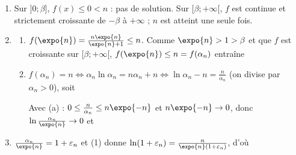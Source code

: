 \begin{description}
\begin{description}
\begin{enumerate}
\begin{enumerate}
\begin{center}
					\end{center}
			\end{enumerate}
		\end{enumerate}
		\item[II-]
		\begin{enumerate}
			\item {}
				Sur $]0;\beta]$, $f(x) \leq 0 < n$ : pas de solution. Sur $[\beta;+\infty[$, $f$ est continue et strictement croissante de $-\beta$ à $+\infty$ ; $n$ est atteint une seule fois.
				\par\noindent{}
			\item
			\begin{enumerate}
				\item {}
					$f(\expo{n}) = \frac{n\expo{n}}{\expo{n} + 1} \leq n$. Comme $\expo{n} > 1 > \beta$ et que $f$ est croissante sur $[\beta;+\infty[$,
					$f(\expo{n}) \leq n = f(\alpha_n)$ entraîne \par\noindent{}
				\item {}
					$f(\alpha_n) = n \iff \alpha_n\ln\alpha_n = n\alpha_n + n \iff \ln\alpha_n - n = \frac{n}{\alpha_n}$ (on divise par $\alpha_n > 0$), soit
					\par\noindent{}
					Avec (a) : $0 \leq \frac{n}{\alpha_n} \leq n\expo{-n}$ et $n\expo{-n} \to 0$, donc $\ln\frac{\alpha_n}{\expo{n}} \to 0$ et
					\par\noindent{}
			\end{enumerate}
			\item {}
				$\frac{\alpha_n}{\expo{n}} = 1 + \varepsilon_n$ et (1) donne $\ln(1 + \varepsilon_n) = \frac{n}{\expo{n}(1 + \varepsilon_n)}$, d'où
				\par\noindent{}

\end{enumerate}
\end{description}
\end{description}
